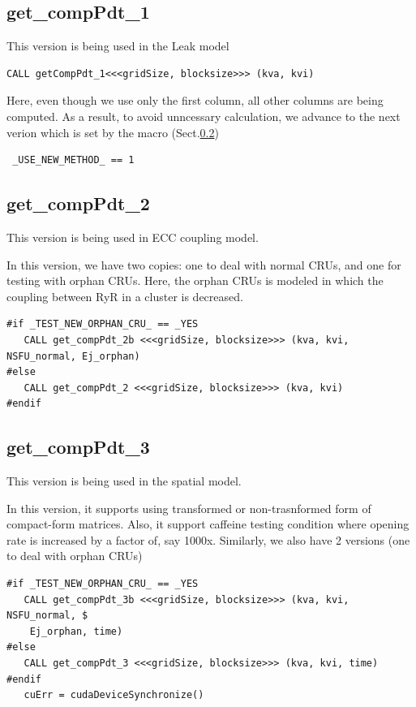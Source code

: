 \subsection{get\_compPdt\_1}
\label{sec:get_compPdt_1}

This version is being used in the Leak model

\begin{verbatim}
CALL getCompPdt_1<<<gridSize, blocksize>>> (kva, kvi)
\end{verbatim}

Here, even though we use only the first column, all other columns are being
computed. As a result, to avoid unncessary calculation, we advance to the next
verion which is set by the macro (Sect.\ref{sec:get_compPdt_2})
\begin{verbatim}
 _USE_NEW_METHOD_ == 1
\end{verbatim}

\subsection{get\_compPdt\_2}
\label{sec:get_compPdt_2}

This version is being used in ECC coupling model.

In this version, we have two copies: one to deal with normal CRUs, and one for
testing with orphan CRUs. Here, the orphan CRUs is modeled in which the coupling
between RyR in a cluster is decreased. 
\begin{verbatim}
#if _TEST_NEW_ORPHAN_CRU_ == _YES 
   CALL get_compPdt_2b <<<gridSize, blocksize>>> (kva, kvi, NSFU_normal, Ej_orphan)
#else
   CALL get_compPdt_2 <<<gridSize, blocksize>>> (kva, kvi)   
#endif
\end{verbatim}


\subsection{get\_compPdt\_3}
\label{sec:get_compPdt_3}

This version is being used in the spatial model. 

In this version, it supports using transformed or non-trasnformed form of
compact-form matrices. Also, it support caffeine testing condition where
opening rate is increased by a factor of, say 1000x. Similarly, we also have 2
versions (one to deal with orphan CRUs)
\begin{verbatim}
#if _TEST_NEW_ORPHAN_CRU_ == _YES 
   CALL get_compPdt_3b <<<gridSize, blocksize>>> (kva, kvi, NSFU_normal, $
    Ej_orphan, time) 
#else
   CALL get_compPdt_3 <<<gridSize, blocksize>>> (kva, kvi, time)   
#endif
   cuErr = cudaDeviceSynchronize()
\end{verbatim}

